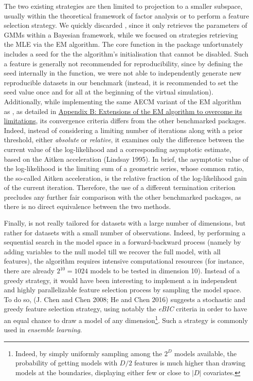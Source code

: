 The two existing strategies are then limited to projection to a smaller subspace, usually within the theoretical framework of factor analysis or to perform a feature selection strategy.
We quickly discarded , since it only retrieves the parameters of GMMs within a Bayesian framework, while we focused on strategies retrieving the MLE via the EM algorithm. The core function  in the  package unfortunately includes a seed for the the algorithm's initialisation that cannot be disabled. Such a feature is generally not recommended for reproducibility, since by defining the seed internally in the function, we were not able to independently generate new reproducible datasets in our benchmark (instead, it is recommended to set the seed value once and for all at the beginning of the virtual simulation). Additionally, while implementing the same AECM variant of the EM algorithm as , as detailed in \protect\hyperlink{appendix-b-extensions-of-the-em-algorithm-to-overcome-its-limitations}{Appendix B: Extensions of the EM algorithm to overcome its limitations}, its convergence criteria differs from the other benchmarked packages. Indeed, instead of considering a limiting number of iterations along with a prior threshold, either \emph{absolute} or \emph{relative}, it examines only the difference between the current value of the log-likelihood and a corresponding asymptotic estimate, based on the Aitken acceleration (Lindsay 1995). In brief, the asymptotic value of the log-likelihood is the limiting sum of a geometric series, whose common ratio, the so-called Aitken acceleration, is the relative fraction of the log-likelihood gain of the current iteration. Therefore, the use of a different termination criterion precludes any further fair comparison with the other benchmarked packages, as there is no direct equivalence between the two methods.

Finally,  is not really tailored for datasets with a large number of dimensions, but rather for datasets with a small number of observations. Indeed, by performing a sequential search in the model space in a forward-backward process (namely by adding variables to the null model till we recover the full model, with all features), the algorithm requires intensive computational resources (for instance, there are already \(2^{10}=1024\) models to be tested in dimension 10). Instead of a greedy strategy, it would have been interesting to implement a in independent and highly parallelizable feature selection process by sampling the model space. To do so, (J. Chen and Chen 2008; He and Chen 2016) suggests a stochastic and greedy feature selection strategy, using notably the \emph{eBIC} criteria in order to have an equal chance to draw a model of any dimension\footnote{Indeed, by simply uniformly sampling among the \(2^D\) models available, the probability of getting models with \(D/2\) features is much higher than drawing models at the boundaries, displaying either few or close to \(|D|\) covariates.}. Such a strategy is commonly used in \emph{ensemble learning}.

